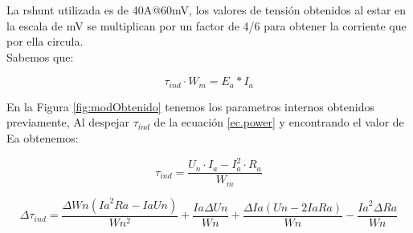 \documentclass[11pt,letterpaper]{article}     %
\begin{document}
		La rshunt utilizada es de 40A@60mV, los valores de tensión obtenidos al estar en la escala de mV se multiplican por un factor de 4/6 para obtener la corriente que por ella circula.\\
		
		Sabemos que:
		
		\begin{equation}
			\tau_{ind}\cdot W_m = E_a*I_a 
			\label{ec.power}
		\end{equation}
		
		En la Figura \ref{fig:modObtenido} tenemos los parametros internos obtenidos previamente, Al despejar $\tau_{ind}$ de la ecuación \ref{ec.power} y encontrando el valor de Ea obtenemos:
		
		\begin{equation}
			\tau_{ind}=\frac{U_n\cdot I_a-I_a^2\cdot R_a}{W_m}
		\end{equation}
		
		\begin{equation}
		\Delta \tau_{ind}=	\frac{\Delta Wn {\left({Ia}^2  Ra-Ia Un\right)}}{Wn^{2}}+\frac{Ia \Delta Un}{Wn}+\frac{ \Delta Ia {\left({Un}-2 {Ia} {Ra}\right)}}{{Wn}}-\frac{{Ia}^2 {\Delta Ra}}{Wn}
		\end{equation}
		
\end{document}
